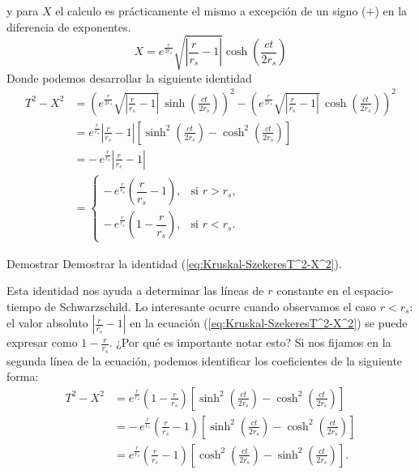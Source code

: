 y para $X$ el calculo es prácticamente el mismo a excepción de un signo ($+$) en la diferencia de exponentes.
\begin{equation}
        X  = e^{\frac{r}{2 r_s}} \sqrt{\left|\frac{r}{r_s}-1\right|}  \cosh\left(\frac{ct}{2r_s}\right)
        \label{eq:Kruskal-SzekeresX(r,t)}
\end{equation}
Donde podemos desarrollar la siguiente identidad
\begin{equation}
    \begin{aligned}
        T^2 - X^2 &= \left( e^{\frac{r}{2r_s}} \sqrt{\left|\frac{r}{r_s}-1\right|}\, \sinh\left(\frac{ct}{2r_s}\right) \right)^2 
        - \left( e^{\frac{r}{2r_s}} \sqrt{\left|\frac{r}{r_s}-1\right|}\, \cosh\left(\frac{ct}{2r_s}\right) \right)^2\\[1mm]
        &= e^{\frac{r}{r_s}} \left|\frac{r}{r_s}-1\right| \left[ \sinh^2\left(\frac{ct}{2r_s}\right) - \cosh^2\left(\frac{ct}{2r_s}\right) \right]\\[1mm]
        &= -\, e^{\frac{r}{r_s}} \left|\frac{r}{r_s}-1\right|\\[2mm]
        &=
        \begin{cases}
            -\, e^{\frac{r}{r_s}} \left(\dfrac{r}{r_s}-1\right), & \text{si } r > r_s,\\[2mm]
            -\, e^{\frac{r}{r_s}} \left(1-\dfrac{r}{r_s}\right), & \text{si } r < r_s.
        \end{cases}
    \end{aligned}
    \label{eq:Kruskal-SzekeresT^2-X^2}
\end{equation}
\begin{task}{Demostrar}{}
    Demostrar la identidad (\ref{eq:Kruskal-SzekeresT^2-X^2}).
\end{task}
Esta identidad nos ayuda a determinar las líneas de \(r\) constante en el espacio-tiempo de Schwarzschild. Lo interesante ocurre cuando observamos el caso \(r < r_s\): el valor absoluto \(\left|\frac{r}{r_s}-1\right|\) en la ecuación (\ref{eq:Kruskal-SzekeresT^2-X^2}) se puede expresar como \(1-\frac{r}{r_s}\). ¿Por qué es importante notar esto? Si nos fijamos en la segunda línea de la ecuación, podemos identificar los coeficientes de la siguiente forma:
\begin{equation}
    \begin{aligned}
        T^2 - X^2 &= e^{\frac{r}{r_s}} \left(1-\frac{r}{r_s}\right) \left[ \sinh^2\left(\frac{ct}{2r_s}\right) - \cosh^2\left(\frac{ct}{2r_s}\right) \right] \\
        &= -\, e^{\frac{r}{r_s}} \left(\frac{r}{r_s}-1\right) \left[ \sinh^2\left(\frac{ct}{2r_s}\right) - \cosh^2\left(\frac{ct}{2r_s}\right) \right] \\
        &= e^{\frac{r}{r_s}} \left(\frac{r}{r_s}-1\right) \left[ \cosh^2\left(\frac{ct}{2r_s}\right) - \sinh^2\left(\frac{ct}{2r_s}\right) \right].
    \end{aligned}
\end{equation}

